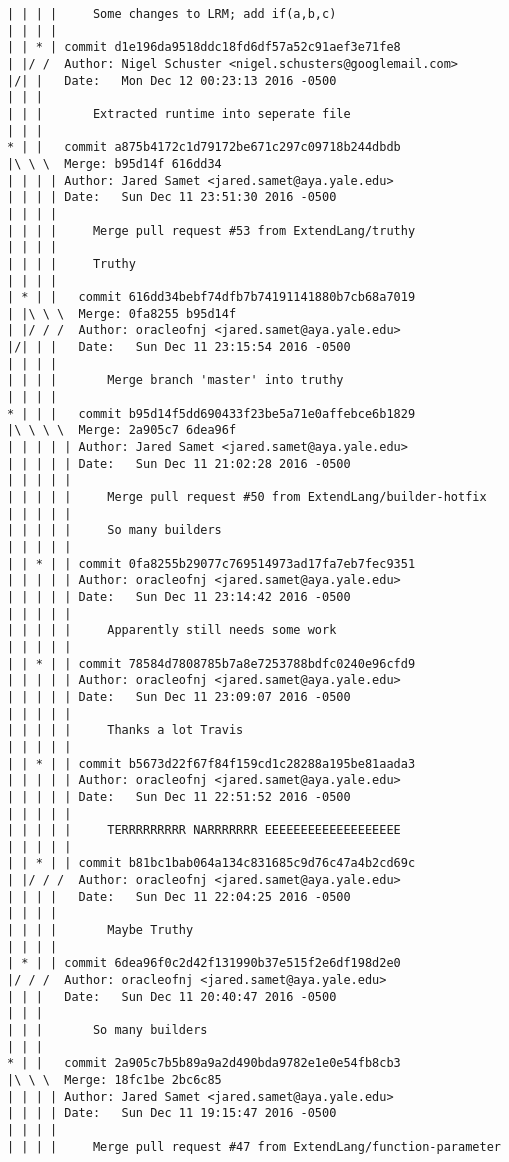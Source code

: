 \begin{lstlisting}
| | | |     Some changes to LRM; add if(a,b,c)
| | | |     
| | * | commit d1e196da9518ddc18fd6df57a52c91aef3e71fe8
| |/ /  Author: Nigel Schuster <nigel.schusters@googlemail.com>
|/| |   Date:   Mon Dec 12 00:23:13 2016 -0500
| | |   
| | |       Extracted runtime into seperate file
| | |      
* | |   commit a875b4172c1d79172be671c297c09718b244dbdb
|\ \ \  Merge: b95d14f 616dd34
| | | | Author: Jared Samet <jared.samet@aya.yale.edu>
| | | | Date:   Sun Dec 11 23:51:30 2016 -0500
| | | | 
| | | |     Merge pull request #53 from ExtendLang/truthy
| | | |     
| | | |     Truthy
| | | |       
| * | |   commit 616dd34bebf74dfb7b74191141880b7cb68a7019
| |\ \ \  Merge: 0fa8255 b95d14f
| |/ / /  Author: oracleofnj <jared.samet@aya.yale.edu>
|/| | |   Date:   Sun Dec 11 23:15:54 2016 -0500
| | | |   
| | | |       Merge branch 'master' into truthy
| | | |       
* | | |   commit b95d14f5dd690433f23be5a71e0affebce6b1829
|\ \ \ \  Merge: 2a905c7 6dea96f
| | | | | Author: Jared Samet <jared.samet@aya.yale.edu>
| | | | | Date:   Sun Dec 11 21:02:28 2016 -0500
| | | | | 
| | | | |     Merge pull request #50 from ExtendLang/builder-hotfix
| | | | |     
| | | | |     So many builders
| | | | |      
| | * | | commit 0fa8255b29077c769514973ad17fa7eb7fec9351
| | | | | Author: oracleofnj <jared.samet@aya.yale.edu>
| | | | | Date:   Sun Dec 11 23:14:42 2016 -0500
| | | | | 
| | | | |     Apparently still needs some work
| | | | |      
| | * | | commit 78584d7808785b7a8e7253788bdfc0240e96cfd9
| | | | | Author: oracleofnj <jared.samet@aya.yale.edu>
| | | | | Date:   Sun Dec 11 23:09:07 2016 -0500
| | | | | 
| | | | |     Thanks a lot Travis
| | | | |      
| | * | | commit b5673d22f67f84f159cd1c28288a195be81aada3
| | | | | Author: oracleofnj <jared.samet@aya.yale.edu>
| | | | | Date:   Sun Dec 11 22:51:52 2016 -0500
| | | | | 
| | | | |     TERRRRRRRRR NARRRRRRR EEEEEEEEEEEEEEEEEEE
| | | | |      
| | * | | commit b81bc1bab064a134c831685c9d76c47a4b2cd69c
| |/ / /  Author: oracleofnj <jared.samet@aya.yale.edu>
| | | |   Date:   Sun Dec 11 22:04:25 2016 -0500
| | | |   
| | | |       Maybe Truthy
| | | |     
| * | | commit 6dea96f0c2d42f131990b37e515f2e6df198d2e0
|/ / /  Author: oracleofnj <jared.samet@aya.yale.edu>
| | |   Date:   Sun Dec 11 20:40:47 2016 -0500
| | |   
| | |       So many builders
| | |      
* | |   commit 2a905c7b5b89a9a2d490bda9782e1e0e54fb8cb3
|\ \ \  Merge: 18fc1be 2bc6c85
| | | | Author: Jared Samet <jared.samet@aya.yale.edu>
| | | | Date:   Sun Dec 11 19:15:47 2016 -0500
| | | | 
| | | |     Merge pull request #47 from ExtendLang/function-parameter

\end{lstlisting}
